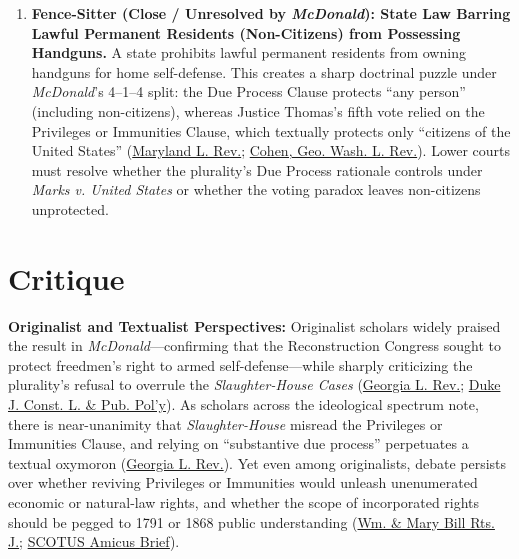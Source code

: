\documentclass[12pt]{article}
\begin{document}
\begin{enumerate}
\item \textbf{Fence-Sitter (Close / Unresolved by \textit{McDonald}): State Law Barring Lawful Permanent Residents (Non-Citizens) from Possessing Handguns.} A state prohibits lawful permanent residents from owning handguns for home self-defense. This creates a sharp doctrinal puzzle under \textit{McDonald}'s 4--1--4 split: the Due Process Clause protects ``any person'' (including non-citizens), whereas Justice Thomas's fifth vote relied on the Privileges or Immunities Clause, which textually protects only ``citizens of the United States'' (\href{https://digitalcommons.law.umaryland.edu/cgi/viewcontent.cgi?article=3523&context=mlr}{Maryland L. Rev.}; \href{https://www.gwlr.org/wp-content/uploads/2012/08/79-3-Cohen.pdf}{Cohen, Geo. Wash. L. Rev.}). Lower courts must resolve whether the plurality's Due Process rationale controls under \textit{Marks v. United States} or whether the voting paradox leaves non-citizens unprotected.
\end{enumerate}

\section{Critique}

\textbf{Originalist and Textualist Perspectives:} Originalist scholars widely praised the result in \textit{McDonald}---confirming that the Reconstruction Congress sought to protect freedmen's right to armed self-defense---while sharply criticizing the plurality's refusal to overrule the \textit{Slaughter-House Cases} (\href{https://digitalcommons.law.uga.edu/cgi/viewcontent.cgi?article=1296&context=glr}{Georgia L. Rev.}; \href{https://scholarship.law.duke.edu/cgi/viewcontent.cgi?article=1062&context=djclpp_sidebar}{Duke J. Const. L. \& Pub. Pol'y}). As scholars across the ideological spectrum note, there is near-unanimity that \textit{Slaughter-House} misread the Privileges or Immunities Clause, and relying on ``substantive due process'' perpetuates a textual oxymoron (\href{https://digitalcommons.law.uga.edu/cgi/viewcontent.cgi?article=1296&context=glr}{Georgia L. Rev.}). Yet even among originalists, debate persists over whether reviving Privileges or Immunities would unleash unenumerated economic or natural-law rights, and whether the scope of incorporated rights should be pegged to 1791 or 1868 public understanding (\href{https://scholarship.law.wm.edu/cgi/viewcontent.cgi?article=1567&context=wmborj}{Wm. \& Mary Bill Rts. J.}; \href{https://www.supremecourt.gov/DocketPDF/24/24-1046/357868/20250501090640899_24-1046\%20Amicus\%20Brief.pdf}{SCOTUS Amicus Brief}).
\end{document}
